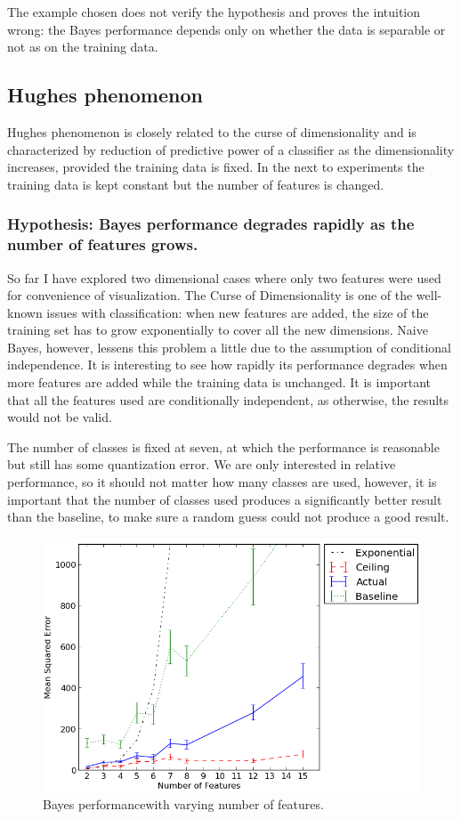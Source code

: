 \documentclass[12pt,a4paper,notitlepage,twoside]{scrbook}
\begin{document}
The example chosen does not verify the hypothesis and proves the intuition wrong: the
Bayes performance depends only on whether the data is separable or not as on the training data.

\subsection{Hughes phenomenon}
Hughes phenomenon is closely related to the curse of dimensionality and is characterized
by reduction of predictive power of a classifier as the dimensionality increases, provided
the training data is fixed.
In the next to experiments the training data is kept constant but the number of features
is changed.
\subsubsection*{Hypothesis: Bayes performance degrades rapidly as the number of features grows.}
So far I have explored two dimensional cases where only two features were used for
convenience of visualization. The Curse of Dimensionality is one of the well-known issues with
classification: when new features are added, the size of the training set has to grow
exponentially to cover all the new dimensions. Naive Bayes, however, lessens this problem
a little due to the assumption of conditional independence. It is interesting to see how
rapidly its performance degrades when more features are added while the training data is
unchanged. It is important that all the features used are conditionally independent, as
otherwise, the results would not be valid. 

The number of classes is fixed at seven, at which the performance is
reasonable but still has some quantization error. We are only interested in
relative performance, so it should not matter how many classes are used,
however, it is important that the number of classes used produces a
significantly better result than the baseline, to make sure a random guess
could not produce a good result.

\begin{figure}[h!]
  \centering
  \includegraphics[width=0.8\linewidth]{figs/feats.png}
  \caption{Bayes performancewith varying number of features.\label{feats}}
\end{figure}
\end{document}
